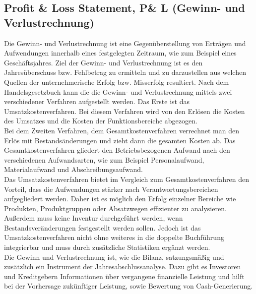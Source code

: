 \subsection{Profit \& Loss Statement, P\& L (Gewinn- und Verlustrechnung)}
Die Gewinn- und Verlustrechnung ist eine Gegenüberstellung von Erträgen und Aufwendungen innerhalb eines festgelegten Zeitraum, wie zum Beispiel eines Geschäftsjahres. Ziel der Gewinn- und Verlustrechnung ist es den Jahresüberschuss bzw. Fehlbetrag zu ermitteln und zu darzustellen aus welchen Quellen der unternehmerische Erfolg bzw. Misserfolg resultiert. Nach dem Handelsgesetzbuch kann die die Gewinn- und Verlustrechnung mittels zwei verschiedener Verfahren aufgestellt werden. Das Erste ist das Umsatzkostenverfahren. Bei diesem Verfahren wird von den Erlösen die Kosten des Umsatzes und die Kosten der Funktionsbereiche abgezogen.
\\
Bei dem Zweiten Verfahren, dem Gesamtkostenverfahren verrechnet man den Erlös mit Bestandsänderungen und zieht dann die gesamten Kosten ab. Das Gesamtkostenverfahren gliedert den Betriebsbezogenen Aufwand nach den verschiedenen Aufwandsarten, wie zum Beispiel Personalaufwand, Materialaufwand und Abschreibungsaufwand.
\\
Das Umsatzkostenverfahren bietet im Vergleich zum Gesamtkostenverfahren den Vorteil, dass die Aufwendungen stärker nach Verantwortungsbereichen aufgegliedert werden. Daher ist es möglich den Erfolg einzelner Bereiche wie Produkten, Produktgruppen oder Absatzwegen effizienter zu analysieren. Außerdem muss keine Inventur durchgeführt werden, wenn Bestandsveränderungen festgestellt werden sollen.
Jedoch ist das Umsatzkostenverfahren nicht ohne weiteres in die doppelte Buchführung integrierbar und muss durch zusätzliche Statistiken ergänzt werden.\cite{umsatzkosten}
\\
Die Gewinn und Verlustrechnung ist,  wie die Bilanz, satzungsmäßig und zusätzlich ein Instrument der Jahresabschlussanalyse. Dazu gibt es Investoren und Kreditgebern Informationen über vergangene finanzielle Leistung und hilft bei der Vorhersage zukünftiger Leistung, sowie Bewertung von Cash-Generierung.


